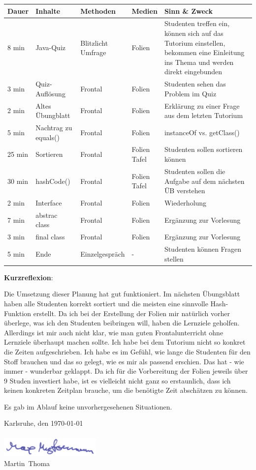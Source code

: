 \documentclass[a4paper,12pt]{article}
\newcommand{\Datum}{\today}             %
\newcommand{\Ort}{Karlsruhe}
\newcommand{\Vorname}{Martin}
\newcommand{\Nachname}{Thoma}
\begin{document}
\begin{tabularx}{\textwidth}{@{}llllX}
Dauer   & Inhalte        & Methoden            & Medien  & Sinn \& Zweck\\
\hline
8 min   & Java-Quiz      & \parbox[t]{2cm}{Blitzlicht\\Umfrage} & Folien  & Studenten treffen ein, können sich auf das Tutorium einstellen, bekommen eine Einleitung ins Thema und werden direkt eingebunden\\
3 min   & Quiz-Auflösung & Frontal  & Folien    & Studenten sehen das Problem im Quiz\\
2 min   & Altes Übungblatt & Frontal& Folien    & Erklärung zu einer Frage aus dem letzten Tutorium\\
5 min   & Nachtrag zu equals() &Frontal & Folien& instanceOf vs. getClass()\\
25 min  & Sortieren      & Frontal  & \parbox[t]{2cm}{Folien\\Tafel}    & Studenten sollen sortieren können\\
30 min  & hashCode()     & Frontal  & \parbox[t]{2cm}{Folien\\Tafel}    & Studenten sollen die Aufgabe auf dem nächsten ÜB verstehen\\
 2 min  & Interface      & Frontal  & Folien    & Wiederholung\\
 7 min  & abstrac class  & Frontal  & Folien    & Ergänzung zur Vorlesung\\
 3 min  & final class    & Frontal  & Folien    & Ergänzung zur Vorlesung\\
 5 min  & Ende           & Einzelgespräch  & -  & Studenten können Fragen stellen\\
\end{tabularx}

\textbf{Kurzreflexion}:

Die Umsetzung dieser Planung hat gut funktioniert. Im nächsten 
Übungsblatt haben alle Studenten korrekt sortiert und die meisten
eine sinnvolle Hash-Funktion erstellt. Da ich bei der Erstellung der
Folien mir natürlich vorher überlege, was ich den Studenten beibringen
will, haben die Lernziele geholfen. Allerdings ist mir auch
nicht klar, wie man guten Frontalunterricht ohne Lernziele überhaupt
machen sollte.
Ich habe bei dem Tutorium nicht so konkret die Zeiten aufgeschrieben.
Ich habe es im Gefühl, wie lange die Studenten für den Stoff brauchen
und das so gelegt, wie es mir als passend erschien. Das hat - wie immer -
wunderbar geklappt. Da ich für die Vorbereitung der Folien jeweils 
über 9 Studen investiert habe, ist es vielleicht nicht ganz so erstaunlich,
dass ich keinen konkreten Zeitplan brauche, um die benötigte Zeit 
abschätzen zu können.

Es gab im Ablauf keine unvorhergesehenen Situationen.

\noindent \Ort, den \Datum\\
\\
\includegraphics[height=10mm]{max-mustermann.pdf}\\
\Vorname~\Nachname
\end{document}
